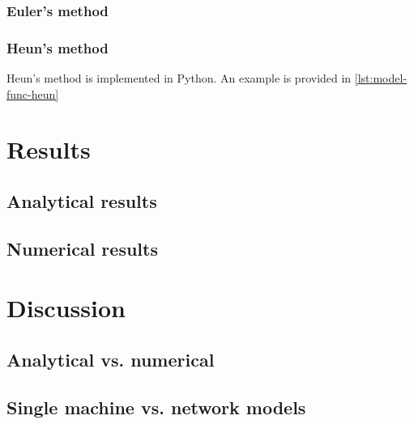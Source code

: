 \subsection*{Euler's method}

\subsection*{Heun's method}
Heun's method is implemented in Python. An example is provided in \autoref{lst:model-func-heun}

\chapter{Results}
\label{chap:results}

\section{Analytical results}

\section{Numerical results}

\chapter{Discussion}
\label{chap:discussion}

\section{Analytical vs. numerical}

\section{Single machine vs. network models}